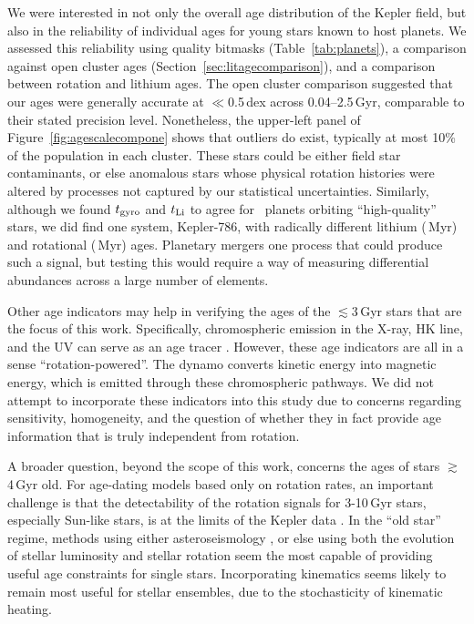 \documentclass[11pt,twocolumn,tighten,linenumbers]{aastex63}
\begin{document}
We were interested in not only the overall age distribution of the
Kepler field, but also in the reliability of individual ages for young
stars known to host planets.  We assessed this reliability using
quality bitmasks (Table~\ref{tab:planets}), a comparison against open
cluster ages (Section~\ref{sec:litagecomparison}), and a comparison
between rotation and lithium ages.  The open cluster comparison
suggested that our ages were generally accurate at $\ll$0.5\,dex
across 0.04--2.5\,Gyr, comparable to their stated precision level.
Nonetheless, the upper-left panel of Figure~\ref{fig:agescalecompone}
shows that outliers do exist, typically at most 10\% of the population
in each cluster.  These stars could be either field star contaminants,
or else anomalous stars whose physical rotation histories were altered
by processes not captured by our statistical uncertainties.
Similarly, although we found $t_{\rm gyro}$ and $t_{\rm Li}$ to agree
for \ltonegyrhighqconfirmedtwosided\ planets orbiting ``high-quality''
stars, we did find one system, Kepler-786, with radically different
lithium (\kepseveneightsix\,Myr) and rotational
(\kepseveneightsixgyro\,Myr) ages.  Planetary mergers
one process that could produce such a signal, but
testing this would require a way of measuring differential abundances
across a large number of elements.

Other age indicators may help in verifying the ages of the
$\lesssim$3\,Gyr stars that are the focus of this work.  Specifically,
chromospheric emission in the X-ray,  HK line, and the UV
can serve as an age tracer
\citep{Mamajek_2008,2014MNRAS.441.2361V,2024ApJ...960...62E}.
However, these age indicators are all in a sense ``rotation-powered''.
The dynamo converts kinetic energy into magnetic energy, which is
emitted through these chromospheric pathways.  We did not attempt to
incorporate these indicators into this study due to concerns regarding
sensitivity, homogeneity, and the question of whether they in fact
provide age information that is truly independent from rotation.

A broader question, beyond the scope of this work, concerns the ages
of stars $\gtrsim$4\,Gyr old.  For age-dating models based only on
rotation rates, an important challenge is that the detectability of
the rotation signals for 3-10\,Gyr stars, especially Sun-like stars,
is at the limits of the Kepler data \citep{2022ApJ...937...94M}.  In
the ``old star'' regime, methods using either asteroseismology
\citep{vanSaders_2016,2024ApJ...962..138S}, or else using both the
evolution of stellar luminosity and stellar rotation
\citep{Angus_2019,Claytor2020,2023ApJ...952..131M} seem the most capable of
providing useful age constraints for single stars.  Incorporating
kinematics \citep{2021AJ....161..189L} seems likely to remain most
useful for stellar ensembles, due to the stochasticity of kinematic
heating.
\end{document}
